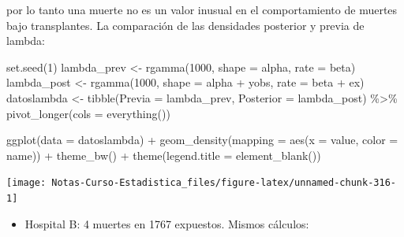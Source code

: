 \documentclass[
  12pt,
]{book}
\newenvironment{Shaded}{\begin{snugshade}}{\end{snugshade}}
\newcommand{\AttributeTok}[1]{\textcolor[rgb]{0.77,0.63,0.00}{#1}}
\newcommand{\DecValTok}[1]{\textcolor[rgb]{0.00,0.00,0.81}{#1}}
\newcommand{\FunctionTok}[1]{\textcolor[rgb]{0.00,0.00,0.00}{#1}}
\newcommand{\NormalTok}[1]{#1}
\newcommand{\OtherTok}[1]{\textcolor[rgb]{0.56,0.35,0.01}{#1}}
\newcommand{\SpecialCharTok}[1]{\textcolor[rgb]{0.00,0.00,0.00}{#1}}
\providecommand{\tightlist}{%
  \setlength{\itemsep}{0pt}\setlength{\parskip}{0pt}}
\theoremstyle{definition}
\theoremstyle{definition}
\theoremstyle{definition}
\theoremstyle{definition}
\theoremstyle{remark}
\begin{document}
por lo tanto una muerte no es un valor inusual en el comportamiento de muertes bajo transplantes. La comparación de las densidades posterior y previa de lambda:

\begin{Shaded}
\begin{Highlighting}[]
\FunctionTok{set.seed}\NormalTok{(}\DecValTok{1}\NormalTok{)}
\NormalTok{lambda\_prev }\OtherTok{\textless{}{-}} \FunctionTok{rgamma}\NormalTok{(}\DecValTok{1000}\NormalTok{, }\AttributeTok{shape =}\NormalTok{ alpha, }\AttributeTok{rate =}\NormalTok{ beta)}
\NormalTok{lambda\_post }\OtherTok{\textless{}{-}} \FunctionTok{rgamma}\NormalTok{(}\DecValTok{1000}\NormalTok{, }\AttributeTok{shape =}\NormalTok{ alpha }\SpecialCharTok{+}\NormalTok{ yobs, }\AttributeTok{rate =}\NormalTok{ beta }\SpecialCharTok{+}
\NormalTok{    ex)}
\NormalTok{datoslambda }\OtherTok{\textless{}{-}} \FunctionTok{tibble}\NormalTok{(}\AttributeTok{Previa =}\NormalTok{ lambda\_prev, }\AttributeTok{Posterior =}\NormalTok{ lambda\_post) }\SpecialCharTok{\%\textgreater{}\%}
    \FunctionTok{pivot\_longer}\NormalTok{(}\AttributeTok{cols =} \FunctionTok{everything}\NormalTok{())}

\FunctionTok{ggplot}\NormalTok{(}\AttributeTok{data =}\NormalTok{ datoslambda) }\SpecialCharTok{+} \FunctionTok{geom\_density}\NormalTok{(}\AttributeTok{mapping =} \FunctionTok{aes}\NormalTok{(}\AttributeTok{x =}\NormalTok{ value,}
    \AttributeTok{color =}\NormalTok{ name)) }\SpecialCharTok{+} \FunctionTok{theme\_bw}\NormalTok{() }\SpecialCharTok{+} \FunctionTok{theme}\NormalTok{(}\AttributeTok{legend.title =} \FunctionTok{element\_blank}\NormalTok{())}
\end{Highlighting}
\end{Shaded}

\begin{center}\texttt{[image: Notas-Curso-Estadistica\_files/figure-latex/unnamed-chunk-316-1]} \end{center}

\begin{itemize}
\tightlist
\item
  Hospital B: 4 muertes en 1767 expuestos. Mismos cálculos:
\end{itemize}
\end{document}
